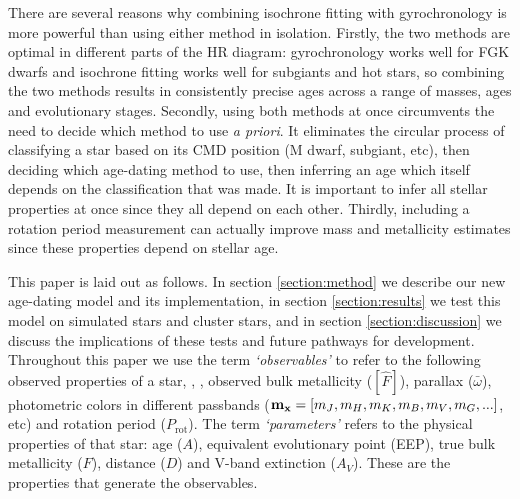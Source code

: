 There are several reasons why combining isochrone fitting with gyrochronology
is more powerful than using either method in isolation.
Firstly, the two methods are optimal in different parts of the HR diagram:
gyrochronology works well for FGK dwarfs and isochrone fitting works well for
subgiants and hot stars, so combining the two methods results in consistently
precise ages across a range of masses, ages and evolutionary stages.
Secondly, using both methods at once circumvents the need to decide which
method to use {\it a priori}.
It eliminates the circular process of classifying a star based on its CMD
position (M dwarf, subgiant, etc), then deciding which age-dating method to
use, then inferring an age which itself depends on the classification that was
made.
It is important to infer all stellar properties at once since they all depend
on each other.
Thirdly, including a rotation period measurement can actually improve mass and
metallicity estimates since these properties depend on stellar age.

This paper is laid out as follows.
In section \ref{section:method} we describe our new age-dating model and its
implementation, in section \ref{section:results} we test this model on
simulated stars and cluster stars, and in section \ref{section:discussion} we
discuss the implications of these tests and future pathways for development.
Throughout this paper we use the term {\it `observables'} to refer to the
following observed properties of a star, \teff, \logg, observed bulk
metallicity ($[\hat{F}]$), parallax ($\bar{\omega}$), photometric
colors in different passbands (${\bf m_x} = [m_J, m_H, m_K, m_B, m_V, m_G,
...]$, etc) and rotation period
($P_{\mathrm{rot}}$).
The term {\it `parameters'} refers to the physical properties of that star:
age ($A$), equivalent evolutionary point (EEP), true bulk metallicity ($F$),
distance ($D$) and V-band extinction ($A_V$).
These are the properties that generate the observables.
